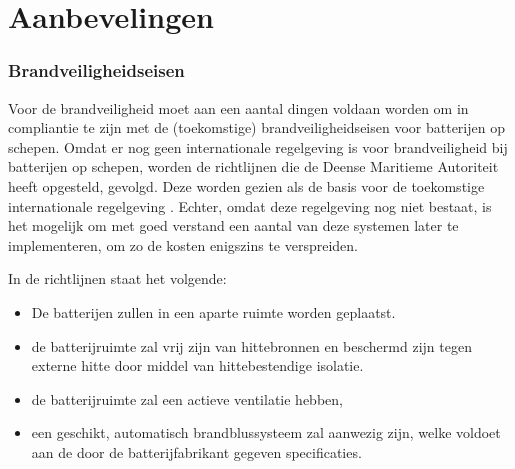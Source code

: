 \chapter{Aanbevelingen}

\subsection{Brandveiligheidseisen} 
Voor de brandveiligheid moet aan een aantal dingen voldaan worden om in compliantie te zijn met de (toekomstige) brandveiligheidseisen voor batterijen op schepen. Omdat er nog geen internationale regelgeving is voor brandveiligheid bij batterijen op schepen, worden de richtlijnen die de Deense Maritieme Autoriteit heeft opgesteld, gevolgd. Deze worden gezien als de basis voor de toekomstige internationale regelgeving \cite{DMA_battery_operation_ships}. Echter, omdat deze regelgeving nog niet bestaat, is het mogelijk om met goed verstand een aantal van deze systemen later te implementeren, om zo de kosten enigszins te verspreiden.

In de richtlijnen staat het volgende:

\begin{itemize}
    \item De batterijen zullen in een aparte ruimte worden geplaatst.
    \item de batterijruimte zal vrij zijn van hittebronnen en beschermd zijn tegen externe hitte door middel van hittebestendige isolatie.
    \item de batterijruimte zal een actieve ventilatie hebben, 
    \item een geschikt, automatisch brandblussysteem zal aanwezig zijn, welke voldoet aan de door de batterijfabrikant gegeven specificaties.
\end{itemize}